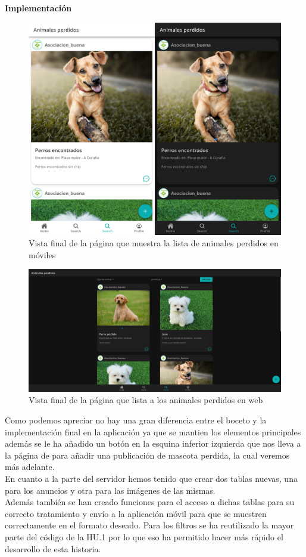 \textbf{Implementación}
\begin{figure}[H]
	\centering
	\includegraphics[width=0.5\linewidth]{"sprint 2/hu3/disenoFinal"}
	\caption{Vista final de la página que muestra la lista de animales perdidos en móviles}
	\label{fig:listaAdop}
\end{figure}

\begin{figure}[H]
	\centering
	\includegraphics[width=0.8\linewidth]{"sprint 2/hu3/disenoFinalWeb"}
	\caption{Vista final de la página que lista a los animales perdidos en web}
	\label{fig:disenofinalweb}
\end{figure}

Como podemos apreciar no hay una gran diferencia entre el boceto y la implementación final en la aplicación ya que se mantien los elementos principales además se le ha añadido un botón en la esquina inferior izquierda que nos lleva a la página de para añadir una publicación de mascota perdida, la cual veremos más adelante.\\

En cuanto a la parte del servidor hemos tenido que crear dos tablas nuevas, una para los anuncios y otra para las imágenes de las mismas.\\

Además también se han creado funciones para el acceso a dichas tablas para su correcto tratamiento y envío a la aplicación móvil para que se muestren correctamente en el formato deseado. Para los filtros se ha reutilizado la mayor parte del código de la HU.1 por lo que eso ha permitido hacer más rápido el desarrollo de esta historia.\\ \\

